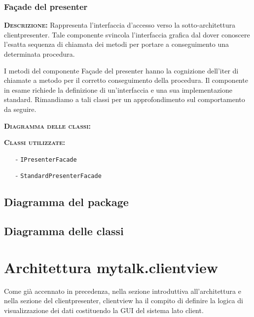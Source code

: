 \subsubsection{Façade del presenter}
\begin{description}
	\item{\scshape\bfseries Descrizione:} 
Rappresenta l'interfaccia d'accesso verso la sotto-architettura clientpresenter. Tale componente svincola l'interfaccia grafica dal dover conoscere l'esatta sequenza di chiamata dei metodi per portare a conseguimento una determinata procedura.

I metodi del componente Façade del presenter hanno la cognizione dell'iter di chiamate a metodo per il corretto conseguimento della procedura. Il componente in esame richiede la definizione di un'interfaccia e una sua implementazione standard. Rimandiamo a tali classi per un approfondimento sul comportamento da seguire.
	\item{\scshape\bfseries Diagramma delle classi:}
	\item{\scshape\bfseries Classi utilizzate:} 
	\begin{itemize}[noitemsep,nolistsep]
		\item[-] \texttt{IPresenterFacade}
		\item[-] \texttt{StandardPresenterFacade}
	\end{itemize}
\end{description}

\subsection{Diagramma del package}

\subsection{Diagramma delle classi}
\clearpage

\section{Architettura mytalk.clientview}
Come già accennato in precedenza, nella sezione introduttiva all'architettura e nella sezione del clientpresenter, clientview ha il compito di definire la logica di visualizzazione dei dati costituendo la GUI del sistema lato client.

